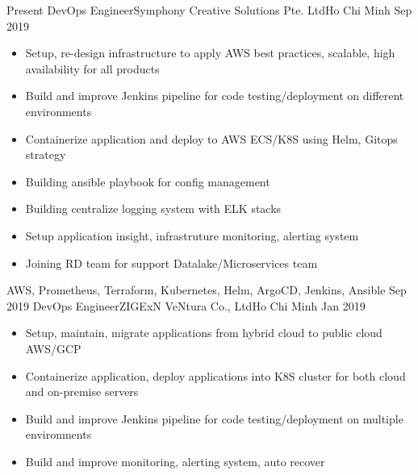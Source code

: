 %
%
%
\begin{experiences}
  \experience
    {Present}   {DevOps Engineer}{Symphony Creative Solutions Pte. Ltd}{Ho Chi Minh}
    {Sep 2019}  {
                      \begin{itemize}
                        \item Setup, re-design infrastructure to apply AWS best practices, scalable, high availability for all products                      
                        \item Build and improve Jenkins pipeline for code testing/deployment on different environments                   
                        \item Containerize application and deploy to AWS ECS/K8S using Helm, Gitops strategy
                        \item Building ansible playbook for config management
                        \item Building centralize logging system with ELK stacks
                        \item Setup application insight, infrastruture monitoring, alerting system
                        \item Joining RD team for support Datalake/Microservices team
                      \end{itemize}
                    }
                    {AWS, Prometheus, Terraform, Kubernetes, Helm, ArgoCD, Jenkins, Ansible}
  \emptySeparator
  \experience
    {Sep 2019} {DevOps Engineer}{ZIGExN VeNtura Co., Ltd}{Ho Chi Minh}
    {Jan 2019}    {
                      \begin{itemize}
                        \item Setup, maintain, migrate applications from hybrid cloud to public cloud AWS/GCP
                        \item Containerize application, deploy applications into K8S cluster for both cloud and on-premise servers
                        \item Build and improve Jenkins pipeline for code testing/deployment on multiple environments
                        \item Build and improve monitoring, alerting system, auto recover

\end{itemize}}
\end{experiences}
